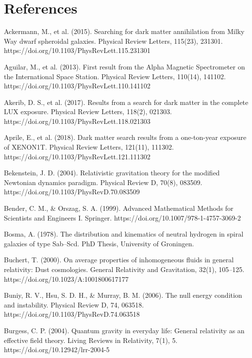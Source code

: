 \section{}\label{section-14}

\section{References}\label{references}

Ackermann, M., et al. (2015). Searching for dark matter annihilation from Milky Way dwarf spheroidal galaxies. Physical Review Letters, 115(23), 231301. https://doi.org/10.1103/PhysRevLett.115.231301

Aguilar, M., et al. (2013). First result from the Alpha Magnetic Spectrometer on the International Space Station. Physical Review Letters, 110(14), 141102. https://doi.org/10.1103/PhysRevLett.110.141102

Akerib, D. S., et al. (2017). Results from a search for dark matter in the complete LUX exposure. Physical Review Letters, 118(2), 021303. https://doi.org/10.1103/PhysRevLett.118.021303

Aprile, E., et al. (2018). Dark matter search results from a one-ton-year exposure of XENON1T. Physical Review Letters, 121(11), 111302. https://doi.org/10.1103/PhysRevLett.121.111302

Bekenstein, J. D. (2004). Relativistic gravitation theory for the modified Newtonian dynamics paradigm. Physical Review D, 70(8), 083509. https://doi.org/10.1103/PhysRevD.70.083509

Bender, C. M., \& Orszag, S. A. (1999). Advanced Mathematical Methods for Scientists and Engineers I. Springer. https://doi.org/10.1007/978-1-4757-3069-2

Bosma, A. (1978). The distribution and kinematics of neutral hydrogen in spiral galaxies of type Sab--Scd. PhD Thesis, University of Groningen.

Buchert, T. (2000). On average properties of inhomogeneous fluids in general relativity: Dust cosmologies. General Relativity and Gravitation, 32(1), 105--125. https://doi.org/10.1023/A:1001800617177

Buniy, R. V., Hsu, S. D. H., \& Murray, B. M. (2006). The null energy condition and instability. Physical Review D, 74, 063518. https://doi.org/10.1103/PhysRevD.74.063518

Burgess, C. P. (2004). Quantum gravity in everyday life: General relativity as an effective field theory. Living Reviews in Relativity, 7(1), 5. https://doi.org/10.12942/lrr-2004-5

